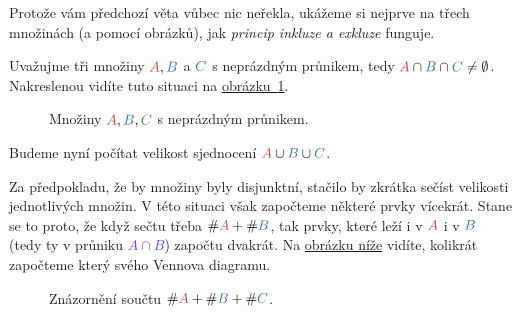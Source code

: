 Protože vám předchozí věta vůbec nic neřekla, ukážeme si nejprve na třech
množinách (a pomocí obrázků), jak \emph{princip inkluze a exkluze} funguje.

Uvažujme tři množiny $\clr{A},\clb{B}$ a $\clg{C}$ s neprázdným průnikem, tedy
$\clr{A} \cap \clb{B} \cap \clg{C} \neq \emptyset$. Nakreslenou vidíte tuto
situaci na
\hyperref[fig:inkluze-exkluze-1]{obrázku~\ref*{fig:inkluze-exkluze-1}}.

\begin{figure}[h]
 \centering
 \caption{Množiny $\clr{A}, \clb{B}, \clg{C}$ s neprázdným průnikem.}
 \label{fig:inkluze-exkluze-1}
\end{figure}

Budeme nyní počítat velikost sjednocení $\clr{A} \cup \clb{B} \cup \clg{C}$.

Za předpokladu, že by množiny byly disjunktní, stačilo by zkrátka sečíst
velikosti jednotlivých množin. V této situaci však započteme některé prvky
vícekrát. Stane se to proto, že když sečtu třeba $\# \clr{A} + \# \clb{B}$, tak
prvky, které leží i v $\clr{A}$ i v $\clb{B}$ (tedy ty v průniku
\textcolor[HTML]{7f33e8}{$A \cap B$}) započtu dvakrát. Na
\hyperref[fig:inkluze-exkluze-2]{obrázku níže} vidíte, kolikrát započteme který
 svého Vennova diagramu.

\begin{figure}[h]
 \centering
 \caption{Znázornění součtu $\# \clr{A} + \# \clb{B} + \# \clg{C}$.}
 \label{fig:inkluze-exkluze-2}
\end{figure}

